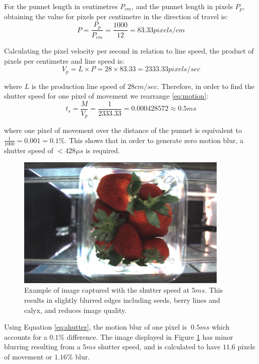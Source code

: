 \documentclass[fleqn,twoside,12pt]{report}
\begin{document}
For the punnet length in centimetres $P_{cm}$, and the punnet length in pixels $P_p$, obtaining the value for pixels per centimetre in the direction of travel is:
\begin{equation}
P = \frac{P_p}{P_{cm}} = \frac{1000}{12} = 83.33 pixels/cm
\end{equation}

Calculating the pixel velocity per second in relation to line speed, the product of pixels per centimetre and line speed is:
\begin{equation}
V_p = L \times P = 28 \times 83.33 = 2333.33 pixels/sec
\end{equation} 

where $L$ is the production line speed of $28cm/sec$. Therefore, in order to find the shutter speed for one pixel of movement we rearrange \ref{eq:motion}:
\begin{equation}
t_s = \frac{M}{V_p} = \frac{1}{2333.33} = 0.000428572 \approx 0.5ms
\label{eq:shutter}
\end{equation}

where one pixel of movement over the distance of the punnet is equivalent to $\frac{1}{1000} = 0.001 = 0.1\%$. This shows that in order to generate zero motion blur, a shutter speed of $<428\mu s$ is required.



\begin{figure}[h]
	\centering
	\includegraphics[width=0.9\textwidth]{blur_1.jpg}
	\caption{Example of image captured with the shutter speed at $5ms$. This results in slightly blurred edges including seeds, berry lines and calyx, and reduces image quality.}
	\label{fig:blur_1}
\end{figure}

Using Equation \ref{eq:shutter}, the motion blur of one pixel is $~0.5ms$ which accounts for a $0.1\%$ difference. The image displayed in Figure \ref{fig:blur_1} has minor blurring resulting from a $5ms$ shutter speed, and is calculated to have $11.6$ pixels of movement or $1.16\%$ blur. 
\end{document}
